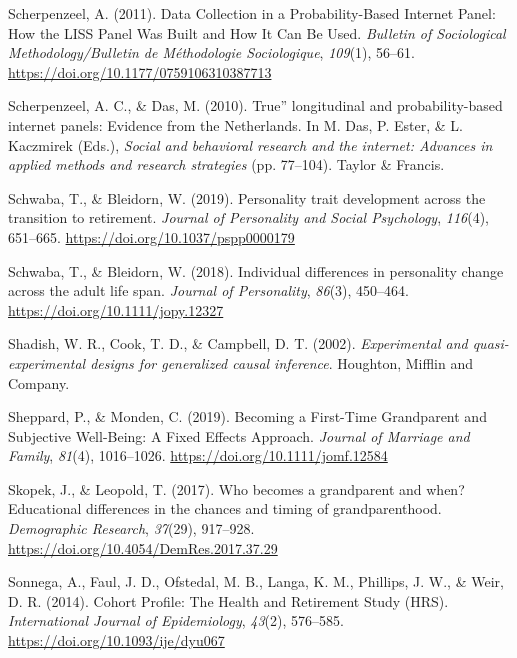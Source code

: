 \documentclass[
  english,
  man, noextraspace]{apa7}
\begin{document}
\leavevmode\hypertarget{ref-scherpenzeelDataCollectionProbabilityBased2011}{}%
Scherpenzeel, A. (2011). Data Collection in a Probability-Based Internet Panel: How the LISS Panel Was Built and How It Can Be Used. \emph{Bulletin of Sociological Methodology/Bulletin de Méthodologie Sociologique}, \emph{109}(1), 56--61. \url{https://doi.org/10.1177/0759106310387713}

\leavevmode\hypertarget{ref-scherpenzeelTrueLongitudinalProbabilitybased2010}{}%
Scherpenzeel, A. C., \& Das, M. (2010). True'' longitudinal and probability-based internet panels: Evidence from the Netherlands. In M. Das, P. Ester, \& L. Kaczmirek (Eds.), \emph{Social and behavioral research and the internet: Advances in applied methods and research strategies} (pp. 77--104). Taylor \& Francis.

\leavevmode\hypertarget{ref-schwabaPersonalityTraitDevelopment2019}{}%
Schwaba, T., \& Bleidorn, W. (2019). Personality trait development across the transition to retirement. \emph{Journal of Personality and Social Psychology}, \emph{116}(4), 651--665. \url{https://doi.org/10.1037/pspp0000179}

\leavevmode\hypertarget{ref-schwabaIndividualDifferencesPersonality2018}{}%
Schwaba, T., \& Bleidorn, W. (2018). Individual differences in personality change across the adult life span. \emph{Journal of Personality}, \emph{86}(3), 450--464. \url{https://doi.org/10.1111/jopy.12327}

\leavevmode\hypertarget{ref-shadishExperimentalQuasiexperimentalDesigns2002}{}%
Shadish, W. R., Cook, T. D., \& Campbell, D. T. (2002). \emph{Experimental and quasi-experimental designs for generalized causal inference}. Houghton, Mifflin and Company.

\leavevmode\hypertarget{ref-sheppardBecomingFirstTimeGrandparent2019}{}%
Sheppard, P., \& Monden, C. (2019). Becoming a First-Time Grandparent and Subjective Well-Being: A Fixed Effects Approach. \emph{Journal of Marriage and Family}, \emph{81}(4), 1016--1026. \url{https://doi.org/10.1111/jomf.12584}

\leavevmode\hypertarget{ref-skopekWhoBecomesGrandparent2017}{}%
Skopek, J., \& Leopold, T. (2017). Who becomes a grandparent and when? Educational differences in the chances and timing of grandparenthood. \emph{Demographic Research}, \emph{37}(29), 917--928. \url{https://doi.org/10.4054/DemRes.2017.37.29}

\leavevmode\hypertarget{ref-sonnegaCohortProfileHealth2014}{}%
Sonnega, A., Faul, J. D., Ofstedal, M. B., Langa, K. M., Phillips, J. W., \& Weir, D. R. (2014). Cohort Profile: The Health and Retirement Study (HRS). \emph{International Journal of Epidemiology}, \emph{43}(2), 576--585. \url{https://doi.org/10.1093/ije/dyu067}
\end{document}
